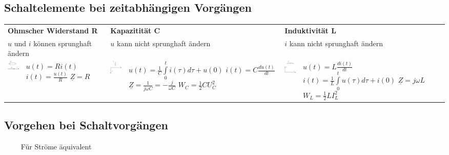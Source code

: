 	\subsection{Schaltelemente bei zeitabhängigen Vorgängen}
	\begin{tabular}{p{1.5cm} p{4.3cm} p{1.5cm} p{4.3cm} p{1.5cm} p{4.3cm}}
   		\multicolumn{2}{l}{\textbf{Ohmscher Widerstand R}}
   			& \multicolumn{2}{l}{\textbf{Kapazitität C}}
   			& \multicolumn{2}{l}{\textbf{Induktivität L}} \\
   		\multicolumn{2}{l}{$u$ und $i$ können sprunghaft ändern}
   			& \multicolumn{2}{l}{$u$ kann nicht sprunghaft ändern}
   			& \multicolumn{2}{l}{$i$ kann nicht sprunghaft ändern} \\
   		\parbox{1.5cm}{
			\includegraphics[width=1.5cm]{./bilder/zeigerdiag-r.png}}
			& \parbox{4.3cm}{$u(t) = R i(t)$ \\
				$i(t) = \frac{u(t)}{R}$ \\
				$\underline{Z} = R$}
   			& \parbox{1.5cm}{
				\includegraphics[width=1.5cm]{./bilder/zeigerdiag-c.png}}
			& \parbox{4.3cm}{
				$u(t) = \frac1C \int\limits_0^t i(\tau) d\tau + u(0)$ \\
				$i(t) = C \frac{d u(t)}{dt}$ \\
				$\underline{Z} = \frac{1}{j \omega C} = - \frac{j}{\omega C}$ \\
				$W_C=\frac12 C U_C^2$}
   			& \parbox{1.5cm}{
				\includegraphics[width=1.5cm]{./bilder/zeigerdiag-l.png}}
			& \parbox{4.3cm}{
				$u(t) = L \frac{di(t)}{dt}$ \\
				$i(t) = \frac1L \int\limits_0^t u(\tau) d\tau + i(0)$ \\
				$\underline{Z} = j \omega L$ \\
				$W_L=\frac12 L I_L^2$}
   	\end{tabular}

	\subsection{Vorgehen bei Schaltvorgängen}
	 $\qquad$ Für Ströme äquivalent
	

